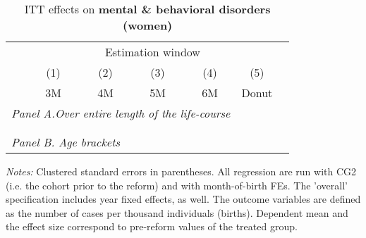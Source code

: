 \vspace*{\fill}
 \begin{table}[H] \centering 
 	\begin{threeparttable} \centering \caption{ITT effects on \textbf{mental \& behavioral disorders (women)}}\label{tab: DD_d5_female} {\def\sym#1{\ifmmode^{#1}\else\(^{#1}\)\fi} 
 			\begin{tabular}{l*{6}{c}}
 				\toprule 
 				& \multicolumn{5}{c}{Estimation window} \\ 
 				\cmidrule(lr){2-6}
 				&\multicolumn{1}{c}{(1)}&\multicolumn{1}{c}{(2)}&\multicolumn{1}{c}{(3)}&\multicolumn{1}{c}{(4)}&\multicolumn{1}{c}{(5)}\\
 				&\multicolumn{1}{c}{3M}&\multicolumn{1}{c}{4M}&\multicolumn{1}{c}{5M}&\multicolumn{1}{c}{6M}&\multicolumn{1}{c}{Donut}\\
 				\midrule
 				\multicolumn{5}{l}{\emph{Panel A.Over entire length of the life-course}} \\
 				 \\ \\
 				\multicolumn{5}{l}{\emph{Panel B. Age brackets}} \\
 				    
 				\bottomrule 
 		\end{tabular}}
 		\begin{tablenotes} 
 			\item \scriptsize \emph{Notes:} Clustered standard errors in parentheses. All regression are run with CG2 (i.e. the cohort prior to the reform) and with month-of-birth FEs. The 'overall' specification includes year fixed effects, as well. The outcome variables are defined as the number of cases per thousand individuals (births). Dependent mean and the effect size correspond to pre-reform values of the treated group.
 		\end{tablenotes} 
 	\end{threeparttable} 
 \end{table}
\vspace*{\fill}\clearpage 
